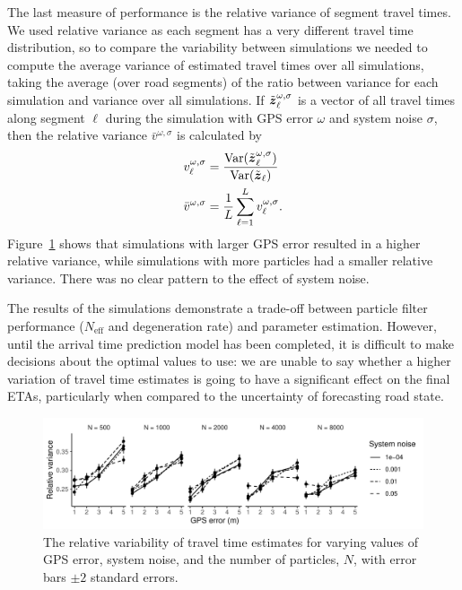 The last measure of performance is the relative variance of segment travel times.
We used relative variance as each segment has a very different travel time distribution,
so to compare the variability between simulations we needed to 
compute the average variance of estimated travel times over all simulations,
taking the average (over road segments) of the ratio between variance for
each simulation and variance over all simulations.
If $\tilde {\boldsymbol{z}}_\ell^{\omega,\sigma}$ is a vector of all travel times
along segment $\ell$ during the simulation with GPS error $\omega$ and system noise $\sigma$,
then the relative variance $\bar v^{\omega,\sigma}$ is calculated by
\begin{equation*}
\begin{split}
v_\ell^{\omega,\sigma} &=
\frac{\mathrm{Var}(\tilde {\boldsymbol{z}}_\ell^{\omega,\sigma})}{\mathrm{Var}(\tilde {\boldsymbol{z}}_\ell)} \\
\bar v^{\omega,\sigma} &=
    \frac{1}{L}\sum_{\ell=1}^L v_\ell^{\omega,\sigma}.
\end{split}
\end{equation*}
Figure~\ref{fig:travel_times} shows that simulations with larger GPS error
resulted in a higher relative variance,
while simulations with more particles had a smaller relative variance.
There was no clear pattern to the effect of system noise.


The results of the simulations
demonstrate a trade-off between particle filter performance
($N_\text{eff}$ and degeneration rate) and parameter estimation.
However, until the arrival time prediction model has been completed,
it is difficult to make decisions about the optimal values to use:
we are unable to say whether a higher variation of travel time estimates
is going to have a significant effect on the final ETAs,
particularly when compared to the uncertainty of forecasting road state.


\begin{figure}[tb]
    \centering
    \includegraphics[width=\textwidth]{figures/04_model_results_times.pdf}
    \caption{
        The relative variability of travel time estimates for varying
        values of GPS error, system noise, and the number of particles, $N$,
        with error bars $\pm 2$ standard errors.
    }
    \label{fig:travel_times}
\end{figure}


